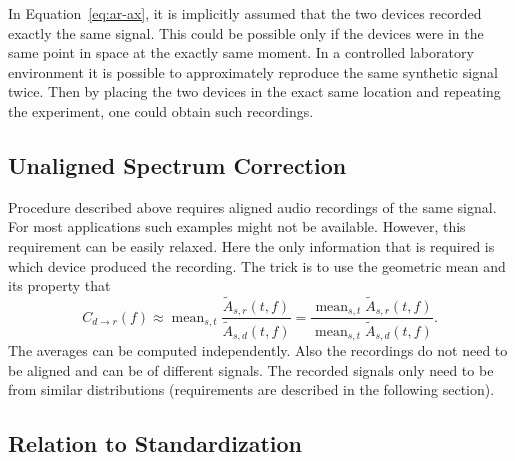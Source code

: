 \documentclass[a4paper]{article}
\newcommand{\va}{A}
\newcommand{\vc}{C}
\newcommand{\vs}{s}
\newcommand{\ff}{f}
\newcommand{\dr}{r}
\newcommand{\dd}{d}
\newcommand{\ampltf}[1]{\widetilde{\va}_{#1}\left(t,\ff\right)}
\newcommand{\coeff}[1]{\vc_{#1}\left(\ff\right)}
\DeclareMathOperator*{\mean}{mean}
\begin{document}
In Equation~\eqref{eq:ar-ax}, it is implicitly assumed that the two devices recorded exactly the same signal. This could be possible only if the devices were in the same point in space at the exactly same moment. In a controlled laboratory environment it is possible to approximately reproduce the same synthetic signal twice. Then by placing the two devices in the exact same location and repeating the experiment, one could obtain such recordings. 


\subsection{Unaligned Spectrum Correction}
\label{ssec:unaligned-spectrum-correction}

Procedure described above requires aligned audio recordings of the same signal. For most applications such examples might not be available. However, this requirement can be easily relaxed. Here the only information that is required is which device produced the recording. 
The trick is to use the geometric mean and its property that
\begin{equation}
    \coeff{\dd\rightarrow\dr}
    \approx \mean_{\vs, t} \frac{\ampltf{\vs,\dr}}{\ampltf{\vs,\dd}}
    =
    \frac{\mean_{\vs, t} \ampltf{\vs,\dr}}{\mean_{\vs, t} \ampltf{\vs,\dd}}
    .
    \label{eq:estimation}
\end{equation}
The averages can be computed independently. Also the recordings do not need to be aligned and can be of different signals. The recorded signals only need to be from similar distributions (requirements are described in the following section).


\subsection{Relation to Standardization}
\label{ssec:simplifications}
\end{document}
